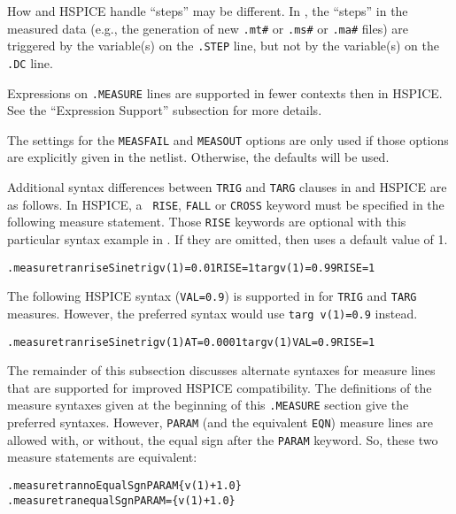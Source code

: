 \begin{XyceItemize}
  \item How \Xyce{} and HSPICE handle ``steps'' may be different.
        In \Xyce{}, the ``steps'' in the measured data (e.g., the
        generation of new \texttt{.mt\#} or \texttt{.ms\#}
        or \texttt{.ma\#} files) are triggered by the variable(s) on
        the {\tt .STEP} line, but not by the variable(s) on the {\tt
        .DC} line.

  \item Expressions on \texttt{.MEASURE} lines are supported in fewer
        contexts then in HSPICE.  See the ``Expression Support''
        subsection for more details.

  \item The settings for the \texttt{MEASFAIL} and \texttt{MEASOUT}
        options are only used if those options are explicitly given in
        the netlist.  Otherwise, the \Xyce{} defaults will be used.
\end{XyceItemize}

Additional syntax differences between {\tt TRIG} and {\tt TARG}
clauses in \Xyce{} and HSPICE are as follows.  In HSPICE, a {\tt
RISE}, {\tt FALL} or {\tt CROSS} keyword must be specified in the
following measure statement.  Those {\tt RISE} keywords are optional
with this particular syntax example in \Xyce{}.  If they are omitted,
then \Xyce{} uses a default value of 1.
\begin{alltt}
.measure tran riseSine trig v(1)=0.01 RISE=1 targ v(1)=0.99 RISE=1
\end{alltt}
The following HSPICE syntax ({\tt VAL=0.9}) is supported in \Xyce{}
for {\tt TRIG} and {\tt TARG} measures. However, the preferred \Xyce{}
syntax would use {\tt targ v(1)=0.9} instead.
\begin{alltt}
.measure tran riseSine trig v(1) AT=0.0001 targ v(1) VAL=0.9 RISE=1
\end{alltt}

The remainder of this subsection discusses alternate syntaxes
for \Xyce{} measure lines that are supported for improved HSPICE
compatibility.  The definitions of the measure syntaxes given at the
beginning of this \texttt{.MEASURE} section give the preferred
\Xyce{} syntaxes.  However, \texttt{PARAM} (and the equivalent \texttt{EQN})
measure lines are allowed with, or without, the equal sign after
the \texttt{PARAM} keyword.  So, these two \Xyce{} measure statements
are equivalent:
\begin{alltt}
.measure tran noEqualSgn PARAM \{v(1)+1.0\}
.measure tran equalSgn PARAM=\{v(1)+1.0\}
\end{alltt}

